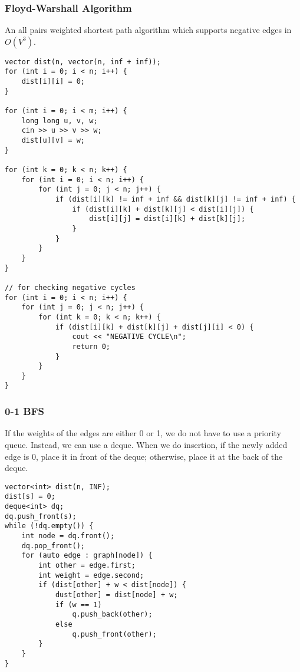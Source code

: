 \subsubsection{Floyd-Warshall Algorithm}
An all pairs weighted shortest path algorithm which supports negative edges in $O(V^3)$.
\begin{lstlisting}
vector dist(n, vector(n, inf + inf));
for (int i = 0; i < n; i++) {
    dist[i][i] = 0;
}

for (int i = 0; i < m; i++) {
    long long u, v, w;
    cin >> u >> v >> w;
    dist[u][v] = w;
}

for (int k = 0; k < n; k++) {
    for (int i = 0; i < n; i++) {
        for (int j = 0; j < n; j++) {
            if (dist[i][k] != inf + inf && dist[k][j] != inf + inf) {
                if (dist[i][k] + dist[k][j] < dist[i][j]) {
                    dist[i][j] = dist[i][k] + dist[k][j];
                }
            }
        }
    }
}

// for checking negative cycles
for (int i = 0; i < n; i++) {
    for (int j = 0; j < n; j++) {
        for (int k = 0; k < n; k++) {
            if (dist[i][k] + dist[k][j] + dist[j][i] < 0) {
                cout << "NEGATIVE CYCLE\n";
                return 0;
            }
        }
    }
}
\end{lstlisting}
\subsubsection{0-1 BFS}
If the weights of the edges are either 0 or 1, we do not have to use a priority queue. 
Instead, we can use a deque. 
When we do insertion, if the newly added edge is 0, place it in front of the deque; otherwise, place it at the back of the deque.
\begin{lstlisting}
vector<int> dist(n, INF);
dist[s] = 0;
deque<int> dq;
dq.push_front(s);
while (!dq.empty()) {
    int node = dq.front();
    dq.pop_front();
    for (auto edge : graph[node]) {
        int other = edge.first;
        int weight = edge.second;
        if (dist[other] + w < dist[node]) {
            dust[other] = dist[node] + w;
            if (w == 1)
                q.push_back(other);
            else
                q.push_front(other);
        }
    }
}
\end{lstlisting}